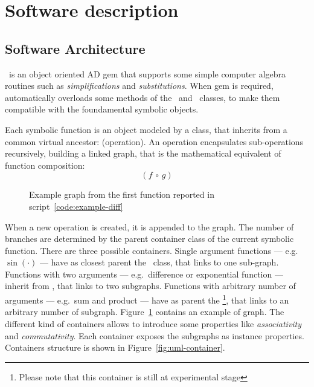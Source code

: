 \section{Software description}
\label{sec:description}


\subsection{Software Architecture}
\label{sec:architecture}


\ragnicas~is an object oriented AD gem that supports some simple computer algebra routines such as \emph{simplifications} and \emph{substitutions}. When gem is required, automatically overloads some methods of the \Fixnum~and \Float~classes, to make them compatible with the foundamental symbolic objects.

Each symbolic function is an object modeled by a class, that inherits from a common virtual ancestor: \CASOp (operation). An operation encapsulates sub-operations recursively, building a linked graph, that is the mathematical equivalent of function composition:
\begin{equation}
\left( f \, \circ \, g \right)
\end{equation}

\begin{figure}[ht!]
\label{fig:graph}
\centering

\caption{Example graph from the first function reported in script~\ref{code:example-diff}}
\end{figure}

When a new operation is created, it is appended to the graph. The number of branches are determined by the parent container class of the current symbolic function. There are three possible containers. Single argument functions --- e.g. $\sin(\cdot)$ --- have as closest parent the \CASOp~class, that links to one sub-graph. Functions with two arguments --- e.g.\ difference or exponential function --- inherit from \CASBinaryOp, that links to two subgraphs. Functions with arbitrary number of arguments --- e.g.\ sum and product --- have as parent the \CASNaryOp\footnote{Please note that this container is still at experimental stage}, that links to an arbitrary number of subgraph. Figure~\ref{fig:graph} contains an example of graph. The different kind of containers allows to introduce some properties like \emph{associativity} and \emph{commutativity}. Each container exposes the subgraphs as instance properties. Containers structure is shown in Figure~\ref{fig:uml-container}.

